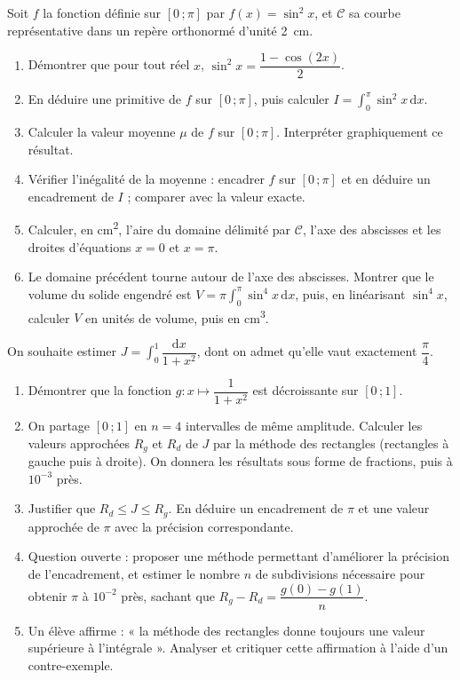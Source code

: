 \documentclass[11pt]{article}
\begin{document}
\begin{exercice}
Soit $f$ la fonction définie sur $[0\,;\pi]$ par $f(x)=\sin^2 x$, et $\mathscr{C}$ sa courbe représentative dans un repère orthonormé d'unité \SI{2}{cm}.
\begin{enumerate}
\item Démontrer que pour tout réel $x$, $\sin^2 x=\dfrac{1-\cos(2x)}{2}$.
\item En déduire une primitive de $f$ sur $[0\,;\pi]$, puis calculer $I=\displaystyle\int_{0}^{\pi}\sin^2 x\,\mathrm{d}x$.
\item Calculer la valeur moyenne $\mu$ de $f$ sur $[0\,;\pi]$. Interpréter graphiquement ce résultat.
\item Vérifier l'inégalité de la moyenne : encadrer $f$ sur $[0\,;\pi]$ et en déduire un encadrement de $I$ ; comparer avec la valeur exacte.
\item Calculer, en \si{cm^2}, l'aire du domaine délimité par $\mathscr{C}$, l'axe des abscisses et les droites d'équations $x=0$ et $x=\pi$.
\item Le domaine précédent tourne autour de l'axe des abscisses. Montrer que le volume du solide engendré est $V=\pi\displaystyle\int_{0}^{\pi}\sin^4 x\,\mathrm{d}x$, puis, en linéarisant $\sin^4 x$, calculer $V$ en unités de volume, puis en \si{cm^3}.
\end{enumerate}
\end{exercice}

\begin{exercice}
On souhaite estimer $J=\displaystyle\int_{0}^{1}\dfrac{\mathrm{d}x}{1+x^2}$, dont on admet qu'elle vaut exactement $\dfrac{\pi}{4}$.
\begin{enumerate}
\item Démontrer que la fonction $g:x\mapsto \dfrac{1}{1+x^2}$ est décroissante sur $[0\,;1]$.
\item On partage $[0\,;1]$ en $n=4$ intervalles de même amplitude. Calculer les valeurs approchées $R_g$ et $R_d$ de $J$ par la méthode des rectangles (rectangles à gauche puis à droite). On donnera les résultats sous forme de fractions, puis à $10^{-3}$ près.
\item Justifier que $R_d\leq J\leq R_g$. En déduire un encadrement de $\pi$ et une valeur approchée de $\pi$ avec la précision correspondante.
\item Question ouverte : proposer une méthode permettant d'améliorer la précision de l'encadrement, et estimer le nombre $n$ de subdivisions nécessaire pour obtenir $\pi$ à $10^{-2}$ près, sachant que $R_g-R_d=\dfrac{g(0)-g(1)}{n}$.
\item Un élève affirme : « la méthode des rectangles donne toujours une valeur supérieure à l'intégrale ». Analyser et critiquer cette affirmation à l'aide d'un contre-exemple.
\end{enumerate}
\end{exercice}
\end{document}
